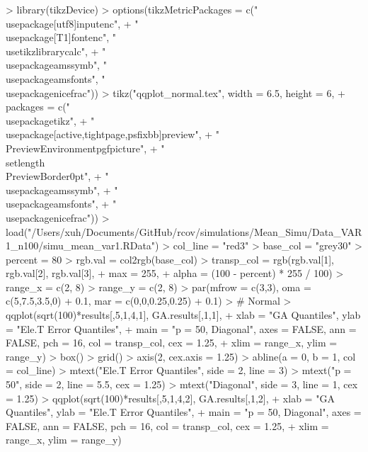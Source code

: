 \documentclass{article}
\begin{document}


\begin{Schunk}
\begin{Sinput}
> library(tikzDevice)
> options(tikzMetricPackages = c("\\usepackage[utf8]{inputenc}",
+     "\\usepackage[T1]{fontenc}", "\\usetikzlibrary{calc}",
+     "\\usepackage{amssymb}", "\\usepackage{amsfonts}", "\\usepackage{nicefrac}"))
> tikz("qqplot_normal.tex", width = 6.5, height = 6,
+      packages = c("\\usepackage{tikz}",
+                  "\\usepackage[active,tightpage,psfixbb]{preview}",
+                  "\\PreviewEnvironment{pgfpicture}",
+                  "\\setlength\\PreviewBorder{0pt}",
+                  "\\usepackage{amssymb}",
+                  "\\usepackage{amsfonts}",
+                  "\\usepackage{nicefrac}"))
> load("/Users/xuh/Documents/GitHub/rcov/simulations/Mean_Simu/Data_VAR1_n100/simu_mean_var1.RData")
> col_line = "red3"
> base_col = "grey30"
> percent = 80
> rgb.val = col2rgb(base_col)
> transp_col = rgb(rgb.val[1], rgb.val[2], rgb.val[3],
+              max = 255,
+              alpha = (100 - percent) * 255 / 100)
> range_x = c(2, 8)
> range_y = c(2, 8)
> par(mfrow = c(3,3), oma = c(5,7.5,3.5,0) + 0.1, mar = c(0,0,0.25,0.25) + 0.1)
> # Normal
> qqplot(sqrt(100)*results[,5,1,4,1], GA.results[,1,1],
+        xlab = "GA Quantiles", ylab = "Ele.T Error Quantiles",
+        main = "p = 50, Diagonal", axes = FALSE, ann = FALSE, pch = 16, col = transp_col, cex = 1.25,
+        xlim = range_x, ylim = range_y)
> box()
> grid()
> axis(2, cex.axis = 1.25)
> abline(a = 0, b = 1, col = col_line)
> mtext("Ele.T Error Quantiles", side = 2, line = 3)
> mtext("p = 50", side = 2, line = 5.5, cex = 1.25)
> mtext("Diagonal", side = 3, line = 1, cex = 1.25)
> qqplot(sqrt(100)*results[,5,1,4,2], GA.results[,1,2],
+        xlab = "GA Quantiles", ylab = "Ele.T Error Quantiles",
+        main = "p = 50, Diagonal", axes = FALSE, ann = FALSE, pch = 16, col = transp_col, cex = 1.25,
+        xlim = range_x, ylim = range_y)

\end{Sinput}
\end{Schunk}
\end{document}
